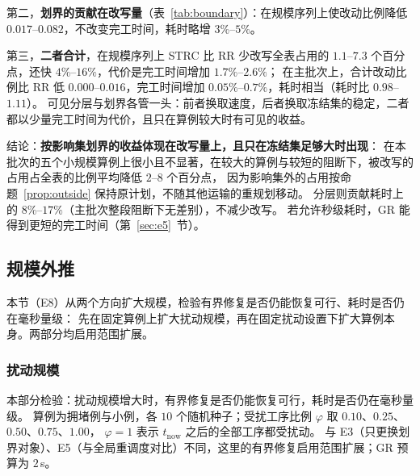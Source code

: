 \documentclass[manuscript,screen,review]{acmart}
\providecommand{\STRC}{\textsc{STRC}}
\newcommand{\NSeeds}{10}
\begin{document}
第二，\textbf{划界的贡献在改写量}（表~\ref{tab:boundary}）：在规模序列上使改动比例降低 \(0.017\)--\(0.082\)，不改变完工时间，耗时略增 \(3\%\)--\(5\%\)。

第三，\textbf{二者合计}，在规模序列上 \STRC{} 比 RR 少改写全表占用的 \(1.1\)--\(7.3\) 个百分点，还快 \(4\%\)--\(16\%\)，代价是完工时间增加 \(1.7\%\)--\(2.6\%\)；
在主批次上，合计改动比例比 RR 低 \(0.000\)--\(0.016\)，完工时间增加 \(0.05\%\)--\(0.7\%\)，耗时相当（耗时比 \(0.98\)--\(1.11\)）。
可见分层与划界各管一头：前者换取速度，后者换取冻结集的稳定，二者都以少量完工时间为代价，且只在算例较大时有可见的收益。

结论：\textbf{按影响集划界的收益体现在改写量上，且只在冻结集足够大时出现}：
在本批次的五个小规模算例上很小且不显著，在较大的算例与较短的阻断下，被改写的占用占全表的比例平均降低 \(2\)--\(8\) 个百分点，
因为影响集外的占用按命题~\ref{prop:outside} 保持原计划，不随其他运输的重规划移动。
分层则贡献耗时上的 \(8\%\)--\(17\%\)（主批次整段阻断下无差别），不减少改写。
若允许秒级耗时，GR 能得到更短的完工时间（第~\ref{sec:e5}~节）。

\subsection{规模外推}
\label{sec:e8}

本节（E8）从两个方向扩大规模，检验有界修复是否仍能恢复可行、耗时是否仍在毫秒量级：
先在固定算例上扩大扰动规模，再在固定扰动设置下扩大算例本身。两部分均启用范围扩展。

\subsubsection{扰动规模}
\label{sec:scale}

本部分检验：扰动规模增大时，有界修复是否仍能恢复可行，耗时是否仍在毫秒量级。
算例为拥堵例与小例，各 \(\NSeeds\) 个随机种子；受扰工序比例 \(\varphi\) 取 \(0.10\)、\(0.25\)、\(0.50\)、\(0.75\)、\(1.00\)，
\(\varphi=1\) 表示 \(t_{\mathrm{now}}\) 之后的全部工序都受扰动。
与 E3（只更换划界对象）、E5（与全局重调度对比）不同，这里的有界修复启用范围扩展；GR 预算为 \(2\)\,s。
\end{document}
